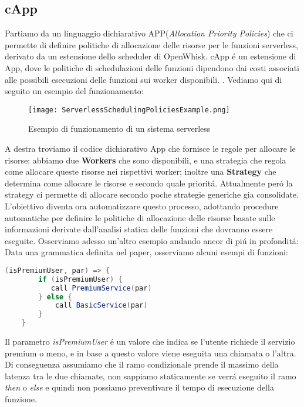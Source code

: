 \documentclass[../../main.tex]{subfiles}
\begin{document}
\subsection{cApp}
\label{cApp}
Partiamo da un linguaggio dichiarativo APP(\textit{Allocation Priority Policies}) che ci permette di definire politiche di allocazione delle risorse per le funzioni serverless, derivato da un estensione dello scheduler di OpenWhisk.
cApp é un estensione di App, dove le politiche di schedulazioni delle funzioni dipendono dai costi associati alle possibili esecuzioni delle funzioni sui worker disponibili.
\autocite{de2020allocation}.
Vediamo qui di seguito un esempio del funzionamento:
\begin{figure}[H]
   \centering
    \texttt{[image: ServerlessSchedulingPoliciesExample.png]}
    \caption{Esempio di funzionamento di un sistema serverless \autocite{deserverless}}
\end{figure}
A destra troviamo il codice dichiarativo App che fornisce le regole per allocare le risorse: abbiamo due \textbf{Workers} che sono disponibili, e una strategia che regola come allocare queste risorse nei rispettivi worker; inoltre una \textbf{Strategy} che determina come allocare le risorse e secondo quale prioritá.
Attualmente peró la strategy ci permette di allocare secondo poche strategie generiche gia consolidate.
L'obiettivo diventa ora automatizzare questo processo, adottando procedure automatiche per definire le politiche di allocazione delle risorse basate sulle informazioni derivate dall'analisi statica delle funzioni che dovranno essere eseguite.
Osserviamo adesso un'altro esempio andando ancor di piú in profonditá:
Data una grammatica definita nel paper\autocite {deserverless}, osserviamo alcuni esempi di funzioni:
\begin{lstlisting}[language=Java, caption= La guardia della condizione é un espressione,label={lst:1}]
    (isPremiumUser, par) => {
        if (isPremiumUser) {
           call PremiumService(par)
        } else {
            call BasicService(par)
        }
    }
\end{lstlisting}

Il parametro \textit{isPremiumUser} é un valore che indica se l'utente richiede il servizio premium o meno, e in base a questo valore viene eseguita una chiamata o l'altra.
Di conseguenza assumiamo che il ramo condizionale prende il massimo della latenza tra le due chiamate, non sappiamo staticamente se verrá eseguito il ramo \textit{then} o \textit{else} e quindi non possiamo preventivare il tempo di esecuzione della funzione.
\end{document}

